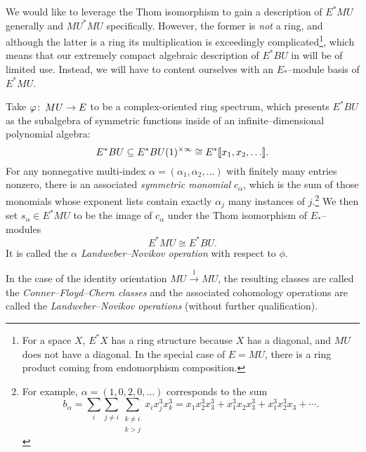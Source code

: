 We would like to leverage the Thom isomorphism to gain a description of \(E^* MU\) generally and \(MU^* MU\) specifically.  However, the former is \emph{not} a ring, and although the latter is a ring its multiplication is exceedingly complicated\footnote{For a space \(X\), \(E^* X\) has a ring structure because \(X\) has a diagonal, and \(MU\) does not have a diagonal.  In the special case of \(E = MU\), there is a ring product coming from endomorphism composition.}, which means that our extremely compact algebraic description of \(E^* BU\) in  will be of limited use.  Instead, we will have to content ourselves with an \(E_*\)--module basis of \(E^* MU\).
\begin{definition}
Take \(\varphi\colon\thinspace MU \to E\) to be a complex-oriented ring spectrum, which presents \(E^* BU\) as the subalgebra of symmetric functions inside of an infinite--dimensional polynomial algebra: \[E^* BU \subseteq E^* BU(1)^{\times \infty} \cong E^*\llbracket{x_1, x_2, \ldots}\rrbracket.\]  For any nonnegative multi-index \(\alpha = (\alpha_1, \alpha_2, \ldots)\) with finitely many entries nonzero, there is an associated \textit{symmetric monomial} \(c_\alpha\), which is the sum of those monomials whose exponent lists contain exactly \(\alpha_j\) many instances of \(j\).\footnote{For example, \(\alpha = (1, 0, 2, 0, \ldots)\) corresponds to the sum \[b_\alpha = \sum_i \sum_{j \ne i} \sum_{\substack{k \ne i \\ k > j}} x_i x_j^3 x_k^3 = x_1 x_2^3 x_3^3 + x_1^3 x_2 x_3^3 + x_1^3 x_2^3 x_3 + \cdots.\]}  We then set \(s_\alpha \in E^* MU\) to be the image of \(c_\alpha\) under the Thom isomorphism of \(E_*\)--modules \[E^* MU \cong E^* BU.\]  It is called the \textit{\(\alpha\){\th} Landweber--Novikov operation} with respect to \(\phi\).
\end{definition}

\begin{definition}
In the case of the identity orientation \(MU \xrightarrow{1} MU\), the resulting classes are called the \textit{Conner--Floyd--Chern classes} and the associated cohomology operations are called the \textit{Landweber--Novikov operations} (without further qualification).
\end{definition}

